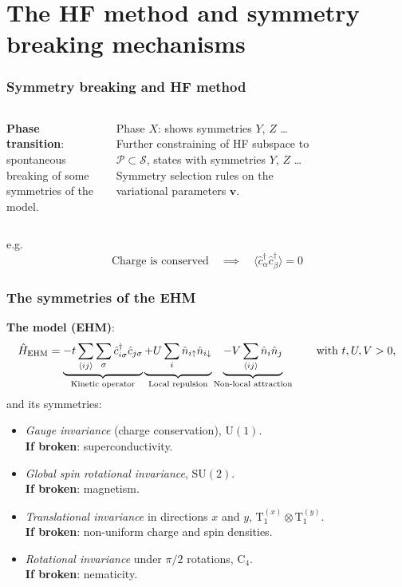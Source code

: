 \def\SectionFolder{sections/syms}
\section{The HF method and symmetry breaking mechanisms}

\begin{frame}
	\frametitle{Symmetry breaking and HF method}
	\begin{columns}	
			\textbf{Phase transition}: spontaneous breaking of some symmetries of the model. \medskip
			
			Phase $X$: shows symmetries $Y$, $Z$ \dots
			\DownImplication
			Further constraining of HF subspace to $\mathcal{P} \subset \mathcal{S}$, states with symmetries $Y$, $Z$ \dots
			\DownImplication
			Symmetry selection rules on the variational parameters $\mathbf{v}$.
			\begin{figure}
				\centering
				\resizebox{\columnwidth}{!}{}
				\caption*{}
			\end{figure}
	\end{columns}
	\vfil
	
	e.g.
	\[
		\text{Charge is conserved}
		\quad\implies\quad
		\langle 
		\hat c_\alpha^\dagger \hat c_\beta^\dagger
		\rangle = 0
	\]
\end{frame}

\begin{frame}
	\frametitle{The symmetries of the EHM}
	\textbf{The model (EHM)}:
	\begin{equation*}
		\hat H_\mathrm{EHM} = 
		\underbrace{
			-t \sum_{\langle ij \rangle} \sum_\sigma \hat c_{i\sigma}^\dagger \hat c_{j\sigma}
		}_\text{Kinetic operator}
		\underbrace{
			+
			\vphantom{\sum_{\langle ij \rangle}}
			U \sum_i \hat n_{i\uparrow} \hat n_{i\downarrow}
		}_\text{Local repulsion} 
		\underbrace{
			-V \sum_{\langle ij \rangle} \hat n_i \hat n_j
		}_\text{Non-local attraction}
		\qquad
		\text{with $t, U, V  > 0$,}
	\end{equation*}
	and its symmetries:
	\begin{itemize}
		\item \textit{Gauge invariance} (charge conservation), $\mathrm{U}(1)$.\\
		\textbf{If broken}: superconductivity.
		\item \textit{Global spin rotational invariance}, $\mathrm{SU}(2)$.\\
		\textbf{If broken}: magnetism.
		\item \textit{Translational invariance} in directions $x$ and $y$, $\mathrm{T}_1^{(x)} \otimes \mathrm{T}_1^{(y)}$.\\
		\textbf{If broken}: non-uniform charge and spin densities.
		\item \textit{Rotational invariance} under $\pi/2$ rotations, $\mathrm{C}_4$.\\
		\textbf{If broken}: nematicity.
		\end{itemize}
\end{frame}

